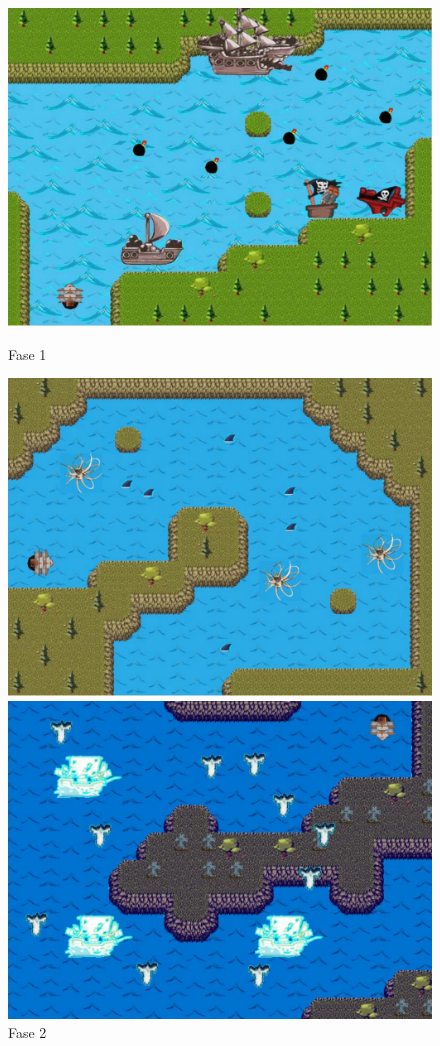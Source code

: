 \documentclass[a4paper,12pt]{article}
\begin{document}
\begin{figure}  
\begin{center}  
\includegraphics[scale=0.30]{img1.pdf}
\caption{Fase 1}
\includegraphics[scale=0.30]{img2.pdf}
\caption{Fase 2}
\includegraphics[scale=0.30]{img3.pdf}

\end{center}
\end{figure}
\end{document}
